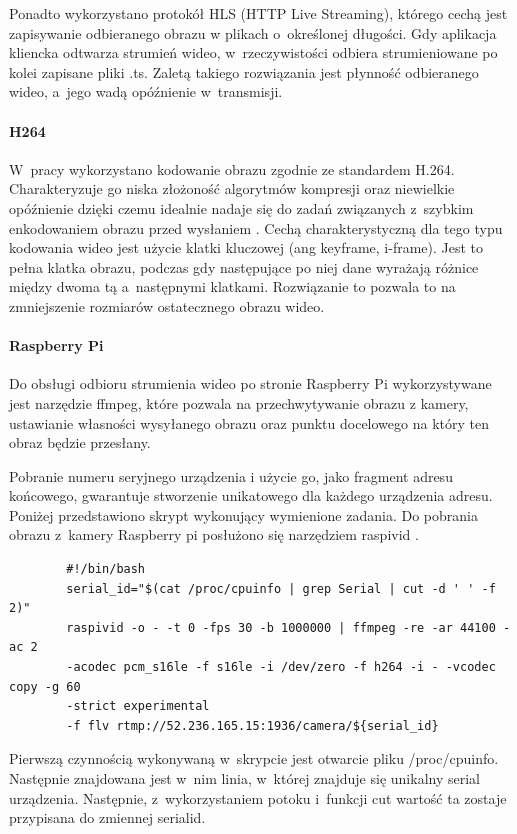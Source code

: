 \documentclass[polish,bachelor,a4paper,oneside]{ppfcmthesis}
\begin{document}
    Ponadto wykorzystano protokół HLS (HTTP Live Streaming), którego cechą jest zapisywanie odbieranego obrazu w plikach o~określonej długości. Gdy aplikacja kliencka odtwarza strumień wideo, w~rzeczywistości odbiera strumieniowane po kolei zapisane pliki .ts. Zaletą takiego rozwiązania jest płynność odbieranego wideo, a~jego wadą opóźnienie w~transmisji.

    \paragraph{H264}
    W~pracy wykorzystano kodowanie obrazu zgodnie ze standardem H.264. Charakteryzuje go niska złożoność algorytmów kompresji oraz niewielkie opóźnienie dzięki czemu idealnie nadaje się do zadań związanych z~szybkim enkodowaniem obrazu przed wysłaniem \cite{H264}.
    Cechą charakterystyczną dla tego typu kodowania wideo jest użycie klatki kluczowej (ang keyframe, i-frame). Jest to pełna klatka obrazu, podczas gdy następujące po niej dane wyrażają różnice między dwoma tą a~następnymi klatkami. Rozwiązanie to pozwala to na zmniejszenie rozmiarów ostatecznego obrazu wideo.

    \paragraph{Raspberry Pi}
    Do obsługi odbioru strumienia wideo po stronie Raspberry Pi wykorzystywane jest narzędzie ffmpeg, które pozwala na przechwytywanie obrazu z kamery, ustawianie własności wysyłanego obrazu oraz punktu docelowego na który ten obraz będzie przesłany.

    Pobranie numeru seryjnego urządzenia i użycie go, jako fragment adresu końcowego, gwarantuje stworzenie unikatowego dla każdego urządzenia adresu. Poniżej przedstawiono skrypt wykonujący wymienione zadania. Do pobrania obrazu z~kamery Raspberry pi posłużono się narzędziem raspivid \cite{raspivid}.
    \begin{verbatim}
        #!/bin/bash
        serial_id="$(cat /proc/cpuinfo | grep Serial | cut -d ' ' -f 2)"
        raspivid -o - -t 0 -fps 30 -b 1000000 | ffmpeg -re -ar 44100 -ac 2
        -acodec pcm_s16le -f s16le -i /dev/zero -f h264 -i - -vcodec copy -g 60
        -strict experimental
        -f flv rtmp://52.236.165.15:1936/camera/${serial_id}
    \end{verbatim}
    Pierwszą czynnością wykonywaną w~skrypcie jest otwarcie pliku /proc/cpuinfo. Następnie znajdowana jest w~nim linia, w~której znajduje się unikalny serial urządzenia. Następnie, z~wykorzystaniem potoku i~funkcji cut wartość ta zostaje przypisana do zmiennej serialid.
\end{document}
